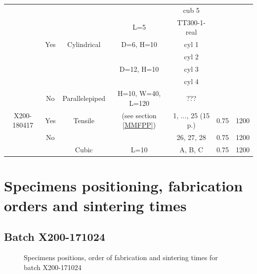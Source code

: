 \begin{center}
\begin{longtable}{@{\extracolsep{\fill}}*{7}{|c}|@{}}
  & & & & cub 5 & &\\
  & & &  L=5& TT300-1-real &  &\\ 
  & Yes &  Cylindrical & D=6, H=10&cyl 1   &  & \\
    & &  & &cyl 2 & & \\
    & &  & D=12, H=10 &cyl 3 & & \\
    & &  &  &cyl 4  & & \\
 & No & Parallelepiped & H=10, W=40, L=120 & ??? & &\\ 
    \hline 
X200-180417 & Yes & Tensile & (see section \ref{MMFPP}) & 1, ..., 25 (15 p.) & 0.75 &1200\\
& No &  & & 26, 27, 28 & 0.75 &1200\\
&  & Cubic & L=10 & A, B, C & 0.75 &1200\\
\end{longtable}

 \end{center}
 
\section{Specimens positioning, fabrication orders and sintering times}
\label{mda}
\subsection{Batch X200-171024}

\begin{figure}[ht]
\centering
\noindent{}
\decoRule
\caption[Specimens positions, order of fabrication and sintering times for batch X200-171024]{Specimens positions, order of fabrication and sintering times for batch X200-171024}
\label{fig:171024-cad}
\end{figure}

